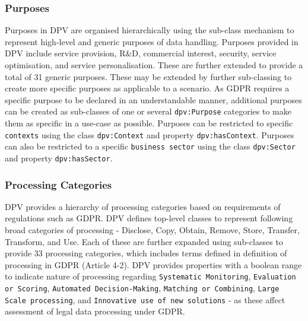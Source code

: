 \subsubsection{Purposes}
Purposes in DPV are organised hierarchically using the sub-class mechanism to represent high-level and generic purposes of data handling.
Purposes provided in DPV include service provision, R\&D, commercial interest, security, service optimisation, and service personalisation. These are further extended to provide a total of 31 generic purposes.
These may be extended by further sub-classing to create more specific purposes as applicable to a scenario.
As GDPR requires a specific purpose to be declared in an understandable manner, additional purposes can be created as sub-classes of one or several \texttt{dpv:Purpose} categories to make them as specific in a use-case as possible.
Purposes can be restricted to specific \texttt{contexts} using the class \texttt{dpv:Context} and property \texttt{dpv:hasContext}.
Purposes can also be restricted to a specific \texttt{business sector} using the class \texttt{dpv:Sector} and property \texttt{dpv:hasSector}.

\subsubsection{Processing Categories}
DPV provides a hierarchy of processing categories based on requirements of regulations such as GDPR. 
DPV defines top-level classes to represent following broad categories of processing - Disclose, Copy, Obtain, Remove, Store, Transfer, Transform, and Use.
Each of these are further expanded using sub-classes to provide 33 processing categories, which includes terms defined in definition of processing in GDPR (Article 4-2).
DPV provides properties with a boolean range to indicate nature of processing regarding \texttt{Systematic Monitoring}, \texttt{Evaluation or Scoring}, \texttt{Automated Decision-Making}, \texttt{Matching or Combining}, \texttt{Large Scale processing}, and \texttt{Innovative use of new solutions} - as these affect assessment of legal data processing under GDPR.


